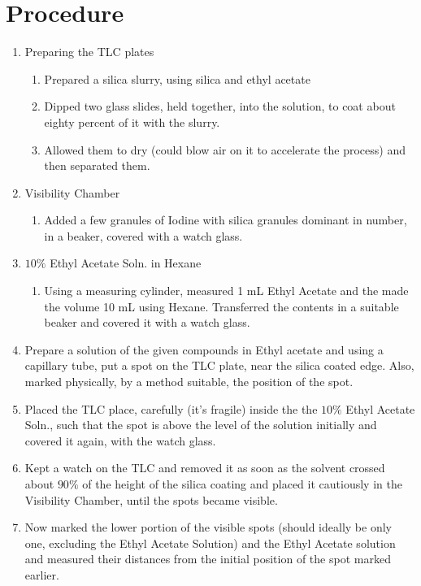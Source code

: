 \section{Procedure}	
	\begin{enumerate}
		\item Preparing the TLC plates
		\begin{enumerate}
			\item Prepared a silica slurry, using silica and ethyl acetate
			\item Dipped two glass slides, held together, into the solution, to coat about eighty percent of it with the slurry.
			\item Allowed them to dry (could blow air on it to accelerate the process) and then separated them.	
		\end{enumerate}
		\item Visibility Chamber
		\begin{enumerate}
			\item Added a few granules of Iodine with silica granules dominant in number, in a beaker, covered with a watch glass.
		\end{enumerate}
		\item $10\%$ Ethyl Acetate Soln. in Hexane
		\begin{enumerate}
			\item Using a measuring cylinder, measured 1 mL Ethyl Acetate and the made the volume 10 mL using Hexane. Transferred the contents in a suitable beaker and covered it with a watch glass.
		\end{enumerate}
		\item Prepare a solution of the given compounds in Ethyl acetate and using a capillary tube, put a spot on the TLC plate, near the silica coated edge. Also, marked physically, by a method suitable, the position of the spot. 
		\item Placed the TLC place, carefully (it's fragile) inside the the $10\%$ Ethyl Acetate Soln., such that the spot is above the level of the solution initially and covered it again, with the watch glass. 
		\item Kept a watch on the TLC and removed it as soon as the solvent crossed about $90\%$ of the height of the silica coating and placed it cautiously in the Visibility Chamber, until the spots became visible.
		\item Now marked the lower portion of the visible spots (should ideally be only one, excluding the Ethyl Acetate Solution) and the Ethyl Acetate solution and measured their distances from the initial position of the spot marked earlier.
	\end{enumerate}
